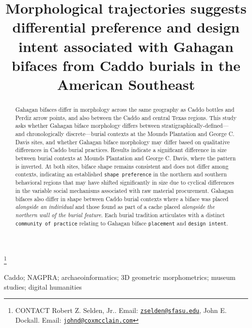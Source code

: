 \documentclass[]{interact}
\theoremstyle{plain}%
\theoremstyle{definition}
\theoremstyle{remark}
\begin{document}

\title{Morphological trajectories suggests differential preference and
design intent associated with Gahagan bifaces from Caddo burials in the
American Southeast}


\author{
}

\thanks{CONTACT Robert Z. Selden,
Jr.. Email: \href{mailto:zselden@sfasu.edu}{\nolinkurl{zselden@sfasu.edu}}, John
E.
Dockall. Email: \href{mailto:johnd@coxmcclain.com}{\nolinkurl{johnd@coxmcclain.com}}}

\maketitle

\begin{abstract}
Gahagan bifaces differ in morphology across the same geography as Caddo
bottles and Perdiz arrow points, and also between the Caddo and central
Texas regions. This study asks whether Gahagan biface morphology differs
between stratigraphically-defined---and chronologically
discrete---burial contexts at the Mounds Plantation and George C. Davis
sites, and whether Gahagan biface morphology may differ based on
qualitative differences in Caddo burial practices. Results indicate a
significant difference in size between burial contexts at Mounds
Plantation and George C. Davis, where the pattern is inverted. At both
sites, biface shape remains consistent and does not differ among
contexts, indicating an established \texttt{shape\ preference} in the
northern and southern behavioral regions that may have shifted
significantly in size due to cyclical differences in the variable social
mechanisms associated with raw material procurement. Gahagan bifaces
also differ in shape between Caddo burial contexts where a biface was
placed \emph{alongside an individual} and those found as part of a cache
placed \emph{alongside the northern wall of the burial feature}. Each
burial tradition articulates with a distinct
\texttt{community\ of\ practice} relating to Gahagan biface
\texttt{placement} and \texttt{design\ intent}.
\end{abstract}

\begin{keywords}
Caddo; NAGPRA; archaeoinformatics; 3D geometric morphometrics; museum
studies; digital humanities
\end{keywords}
\end{document}
